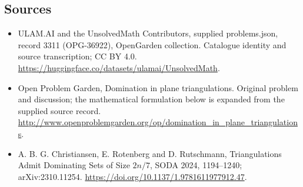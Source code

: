 \documentclass[11pt,a4paper]{article}
\begin{document}
\subsection{Sources}
\begin{itemize}
\item[S1] ULAM.AI and the UnsolvedMath Contributors, supplied problems.json, record 3311 (OPG-36922), OpenGarden collection. Catalogue identity and source transcription; CC BY 4.0.
\url{https://huggingface.co/datasets/ulamai/UnsolvedMath}.
\item[S2] Open Problem Garden, Domination in plane triangulations. Original problem and discussion; the mathematical formulation below is expanded from the supplied source record.
\url{http://www.openproblemgarden.org/op/domination_in_plane_triangulations}.

\item[S3] A. B. G. Christiansen, E. Rotenberg and D. Rutschmann, Triangulations Admit Dominating Sets of Size $2n/7$, SODA 2024, 1194--1240; arXiv:2310.11254.
\url{https://doi.org/10.1137/1.9781611977912.47}.
\end{itemize}
\end{document}
